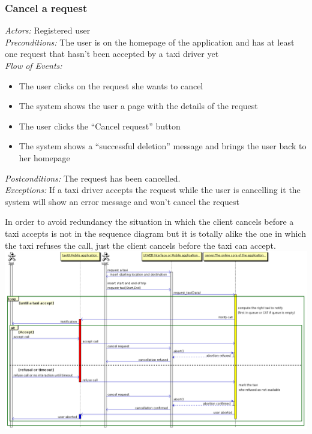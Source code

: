 \documentclass{article}
\begin{document}
\subsubsection{Cancel a request}
\textit{Actors:} Registered user
\\\textit{Preconditions:} The user is on the homepage of the application and has at least one request that hasn't been accepted by a taxi driver yet
\\\textit{Flow of Events:}
\begin{itemize}
	\item  The user clicks on the request she wants to cancel
	\item  The system shows the user a page with the details of the request
	\item  The user clicks the ``Cancel request'' button
	\item  The system shows a ``successful deletion'' message and brings the user back to her homepage
\end{itemize}
\textit{Postconditions:} The request has been cancelled.
\\\textit{Exceptions:} If a taxi driver accepts the request while the user is cancelling it the system will show an error message and won't cancel the request
\begin{center}	
In order to avoid redundancy the situation in which the client cancels before a taxi accepts is not in the sequence diagram but it is totally alike the one in which the taxi refuses the call, just the client cancels before the taxi can accept.\\
	\includegraphics[width=\textwidth,keepaspectratio]{Sequence-Diagrams/cancel-request}
\end{center}
\end{document}
